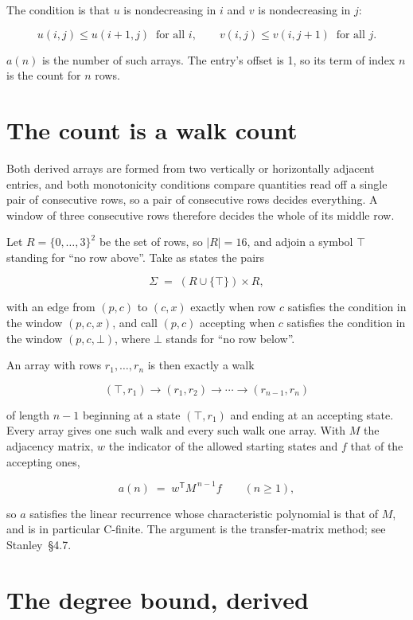 \documentclass[11pt]{article}
\theoremstyle{definition}
\begin{document}
The condition is that $u$ is nondecreasing in $i$ and $v$ is nondecreasing in $j$:

\[u(i,j) \le u(i{+}1,j) \ \text{ for all } i, \qquad v(i,j) \le v(i,j{+}1) \ \text{ for all } j.\]

$a(n)$ is the number of such arrays. The entry's offset is 1, so its term of index $n$ is the count for $n$ rows.

\section{The count is a walk count}

Both derived arrays are formed from two vertically or horizontally adjacent entries, and both monotonicity conditions compare quantities read off a single pair of consecutive rows, so a pair of consecutive rows decides everything. A window of three consecutive rows therefore decides the whole of its middle row.

Let $R = \{0,\dots,3\}^{2}$ be the set of rows, so $|R| = 16$, and adjoin a symbol $\top$ standing for ``no row above''. Take as states the pairs

\[\Sigma \;=\; (R \cup \{\top\}) \times R,\]

with an edge from $(p,c)$ to $(c,x)$ exactly when row $c$ satisfies the condition in the window $(p,c,x)$, and call $(p,c)$ accepting when $c$ satisfies the condition in the window $(p,c,\bot)$, where $\bot$ stands for ``no row below''.

An array with rows $r_1,\dots,r_n$ is then exactly a walk

\[(\top,r_1) \to (r_1,r_2) \to \cdots \to (r_{n-1},r_n)\]

of length $n-1$ beginning at a state $(\top,r_1)$ and ending at an accepting state. Every array gives one such walk and every such walk one array. With $M$ the adjacency matrix, $w$ the indicator of the allowed starting states and $f$ that of the accepting ones,

\[a(n) \;=\; w^{\mathsf T} M^{\,n-1} f \qquad (n \ge 1),\]

so $a$ satisfies the linear recurrence whose characteristic polynomial is that of $M$, and is in particular C-finite. The argument is the transfer-matrix method; see Stanley~\S4.7.

\section{The degree bound, derived}
\end{document}
